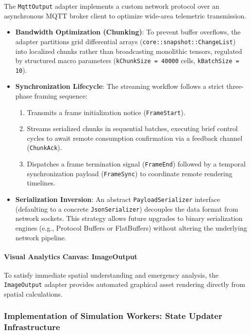 The \texttt{MqttOutput} adapter implements a custom network protocol over an asynchronous MQTT broker client to optimize wide-area telemetric transmission.

\begin{itemize}
    \item \textbf{Bandwidth Optimization (Chunking)}: To prevent buffer overflows, the adapter partitions grid differential arrays (\texttt{core::snapshot::ChangeList}) into localized chunks rather than broadcasting monolithic tensors, regulated by structured macro parameters (\texttt{kChunkSize = 40000} cells, \texttt{kBatchSize = 10}).
    
    \item \textbf{Synchronization Lifecycle}: The streaming workflow follows a strict three-phase framing sequence:
    \begin{enumerate}
        \item Transmits a frame initialization notice (\texttt{FrameStart}).
        \item Streams serialized chunks in sequential batches, executing brief control cycles to await remote consumption confirmation via a feedback channel (\texttt{ChunkAck}).
        \item Dispatches a frame termination signal (\texttt{FrameEnd}) followed by a temporal synchronization payload (\texttt{FrameSync}) to coordinate remote rendering timelines.
    \end{enumerate}
    
    \item \textbf{Serialization Inversion}: An abstract \texttt{PayloadSerializer} interface (defaulting to a concrete \texttt{JsonSerializer}) decouples the data format from network sockets. This strategy allows future upgrades to binary serialization engines (e.g., Protocol Buffers or FlatBuffers) without altering the underlying network pipeline.
\end{itemize}

\paragraph{Visual Analytics Canvas: ImageOutput}

To satisfy immediate spatial understanding and emergency analysis, the \texttt{ImageOutput} adapter provides automated graphical 
asset rendering directly from spatial calculations.


\subsubsection{Implementation of Simulation Workers: State Updater Infrastructure}
\label{subsec:state_updater_implementation}

